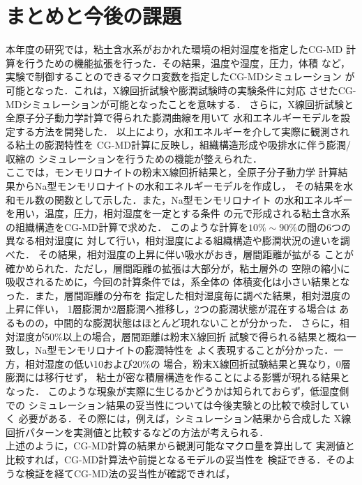 ﻿\documentclass[11pt,a4j]{jarticle}
\begin{document}
\section{まとめと今後の課題}
本年度の研究では，粘土含水系がおかれた環境の相対湿度を指定したCG-MD
計算を行うための機能拡張を行った．その結果，温度や湿度，圧力，体積
など，実験で制御することのできるマクロ変数を指定したCG-MDシミュレーション
が可能となった．これは，X線回折試験や膨潤試験時の実験条件に対応
させたCG-MDシミュレーションが可能となったことを意味する． 
さらに，X線回折試験と全原子分子動力学計算で得られた膨潤曲線を用いて
水和エネルギーモデルを設定する方法を開発した．
以上により，水和エネルギーを介して実際に観測される粘土の膨潤特性を
CG-MD計算に反映し，組織構造形成や吸排水に伴う膨潤/収縮の
シミュレーションを行うための機能が整えられた．\\
\hspace{\parindent}
ここでは，モンモリロナイトの粉末X線回折結果と，全原子分子動力学
計算結果からNa型モンモリロナイトの水和エネルギーモデルを作成し，
その結果を水和モル数の関数として示した．また，Na型モンモリロナイト
の水和エネルギーを用い，温度，圧力，相対湿度を一定とする条件
の元で形成される粘土含水系の組織構造をCG-MD計算で求めた．
このような計算を$10\%\sim 90\%$の間の6つの異なる相対湿度に
対して行い，相対湿度による組織構造や膨潤状況の違いを調べた．
その結果，相対湿度の上昇に伴い吸水がおき，層間距離が拡がる
ことが確かめられた．ただし，層間距離の拡張は大部分が，粘土層外の
空隙の縮小に吸収されるために，今回の計算条件では，系全体の
体積変化は小さい結果となった．また，層間距離の分布を
指定した相対湿度毎に調べた結果，相対湿度の上昇に伴い，
1層膨潤か2層膨潤へ推移し，2つの膨潤状態が混在する場合は
あるものの，中間的な膨潤状態はほとんど現れないことが分かった．
さらに，相対湿度が50$\%$以上の場合，層間距離は粉末X線回折
試験で得られる結果と概ね一致し，Na型モンモリロナイトの膨潤特性を
よく表現することが分かった．一方，相対湿度の低い10および20$\%$の
場合，粉末X線回折試験結果と異なり，0層膨潤には移行せず，
粘土が密な積層構造を作ることによる影響が現れる結果となった．
このような現象が実際に生じるかどうかは知られておらず，低湿度側での
シミュレーション結果の妥当性については今後実験との比較で検討していく
必要がある．その際には，例えば，シミュレーション結果から合成した
X線回折パターンを実測値と比較するなどの方法が考えられる．\\
\hspace{\parindent}
上述のように，CG-MD計算の結果から観測可能なマクロ量を算出して
実測値と比較すれば，CG-MD計算法や前提となるモデルの妥当性を
検証できる．そのような検証を経てCG-MD法の妥当性が確認できれば，
\end{document}
